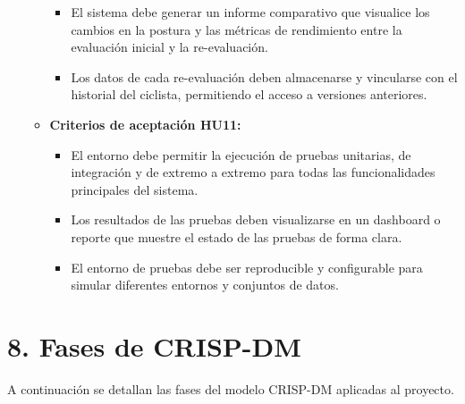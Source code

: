 \documentclass[
11pt, %
]{charter}
\begin{document}
\begin{itemize}
\begin{itemize}
\begin{itemize}
          \item El sistema debe generar un informe comparativo que visualice los cambios en la postura y las métricas de rendimiento entre la evaluación inicial y la re-evaluación.
          \item Los datos de cada re-evaluación deben almacenarse y vincularse con el historial del ciclista, permitiendo el acceso a versiones anteriores.
        \end{itemize}
      \item \textbf{Criterios de aceptación HU11:}
        \begin{itemize}
          \item El entorno debe permitir la ejecución de pruebas unitarias, de integración y de extremo a extremo para todas las funcionalidades principales del sistema.
          \item Los resultados de las pruebas deben visualizarse en un dashboard o reporte que muestre el estado de las pruebas de forma clara. 
          \item El entorno de pruebas debe ser reproducible y configurable para simular diferentes entornos y conjuntos de datos. 
        \end{itemize}
    \end{itemize}
\end{itemize}

\section{8. Fases de CRISP-DM}
\label{sec:crisp}

A continuación se detallan las fases del modelo CRISP-DM aplicadas al proyecto.
\end{document}
